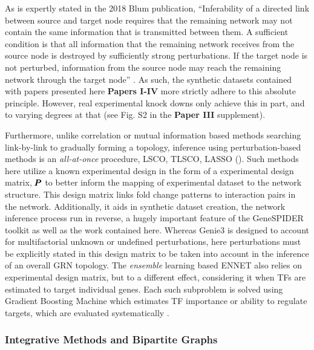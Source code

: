 As is expertly stated in the 2018 Blum \etal publication, ``Inferability of a directed link between source and target node requires that the remaining network may not contain the same information that is transmitted between them. A sufficient condition is that all information that the remaining network receives from the source node is destroyed by sufficiently strong perturbations. If the target node is not perturbed, information from the source node may reach the remaining network through the target node'' \citep{blum2018experimental}. As such, the synthetic datasets contained with papers presented here \textbf{Papers I-IV} more strictly adhere to this absolute principle. However, real experimental knock downs only achieve this in part, and to varying degrees at that (see Fig. S2 in the \textbf{Paper III} supplement).

Furthermore, unlike correlation or mutual information based methods searching link-by-link to gradually forming a topology, inference using perturbation-based methods is an {\it all-at-once} procedure, \eg LSCO, TLSCO, LASSO (). Such methods here utilize a known experimental design in the form of a experimental design matrix, \ie ${\pmb{P}}$ to better inform the mapping of experimental dataset to the network structure. This design matrix links fold change patterns to interaction pairs in the network. Additionally, it aids in synthetic dataset creation, the network inference process run in reverse, a hugely important feature of the GeneSPIDER toolkit as well as the work contained here. Whereas Genie3 is designed to account for multifactorial unknown or undefined perturbations, here perturbations must be explicitly stated in this design matrix to be taken into account in the inference of an overall GRN topology. 
The \emph{ensemble} learning based ENNET also relies on experimental design matrix, but to a different effect, considering it when TFs are estimated to target individual genes. Each such subproblem is solved using Gradient Boosting Machine which estimates TF importance or ability to regulate targets, which are evaluated systematically \citep{slawek2013ennet}.

\subsubsection{Integrative Methods and Bipartite Graphs}
\label{sec:bipart}

